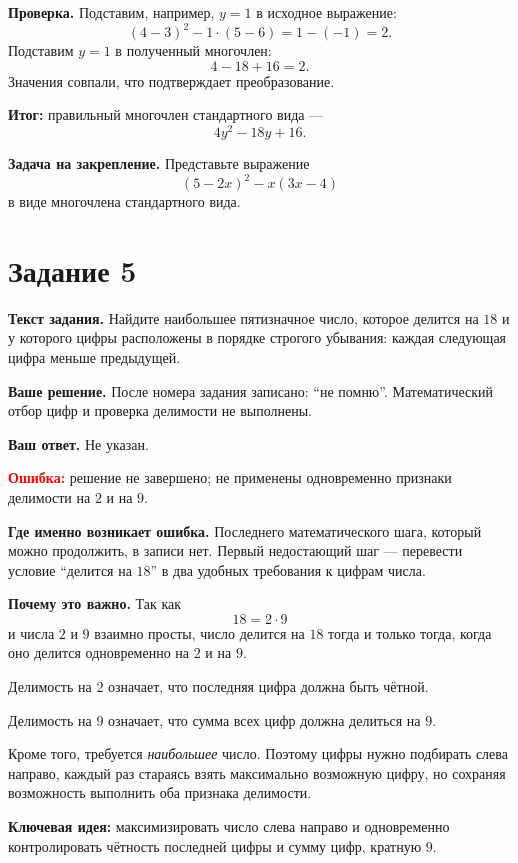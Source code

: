 \documentclass[12pt,a4paper]{article}
\begin{document}
\textbf{Проверка.}
Подставим, например, $y=1$ в исходное выражение:
\[
(4-3)^2-1\cdot(5-6)=1-(-1)=2.
\]
Подставим $y=1$ в полученный многочлен:
\[
4-18+16=2.
\]
Значения совпали, что подтверждает преобразование.

\textcolor{teal!60!black}{\textbf{Итог:}}
правильный многочлен стандартного вида ---
\[
\boxed{4y^2-18y+16}.
\]

\textbf{Задача на закрепление.}
Представьте выражение
\[
(5-2x)^2-x(3x-4)
\]
в виде многочлена стандартного вида.

\newpage
{}\label{task:5}
\section*{Задание 5}

\textbf{Текст задания.}
Найдите наибольшее пятизначное число, которое делится на $18$ и у которого цифры расположены в порядке строгого убывания: каждая следующая цифра меньше предыдущей.

\textbf{Ваше решение.}
После номера задания записано: ``не помню''. Математический отбор цифр и проверка делимости не выполнены.

\textbf{Ваш ответ.}
Не указан.

\textcolor{red}{\textbf{Ошибка:}} решение не завершено; не применены одновременно признаки делимости на $2$ и на $9$.

\textbf{Где именно возникает ошибка.}
Последнего математического шага, который можно продолжить, в записи нет. Первый недостающий шаг --- перевести условие ``делится на $18$'' в два удобных требования к цифрам числа.

\textbf{Почему это важно.}
Так как
\[
18=2\cdot9
\]
и числа $2$ и $9$ взаимно просты, число делится на $18$ тогда и только тогда, когда оно делится одновременно на $2$ и на $9$.

Делимость на $2$ означает, что последняя цифра должна быть чётной.

Делимость на $9$ означает, что сумма всех цифр должна делиться на $9$.

Кроме того, требуется \emph{наибольшее} число. Поэтому цифры нужно подбирать слева направо, каждый раз стараясь взять максимально возможную цифру, но сохраняя возможность выполнить оба признака делимости.

\textcolor{blue!60!black}{\textbf{Ключевая идея:}}
максимизировать число слева направо и одновременно контролировать чётность последней цифры и сумму цифр, кратную $9$.
\end{document}
